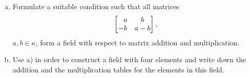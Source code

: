 \begin{probl}${}$
    \begin{enumerate}[a),font=\upshape]
    \item Formulate a suitable condition such that all matrices
    $$
        \begin{bmatrix}
            \hphantom-a & b \\
            -b & a - b
        \end{bmatrix},
    $$
    $a, b \in\kappa$, form a field with respect to matrix addition and multiplication.
    
    \item Use {\rm a)} in order to construct a field with four elements and write down the addition and the multiplication tables for the elements in this field.
    \end{enumerate}
\end{probl}


